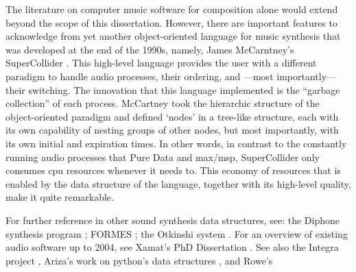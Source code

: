 	The literature on computer music software for composition alone would extend beyond the scope of this dissertation. However, there are important features to acknowledge from yet another object-oriented language for music synthesis that was developed at the end of the 1990s, namely, James McCarntney's SuperCollider \parencite{DBLP:conf/icmc/McCartney96, DBLP:conf/icmc/McCartney98}. This high-level language provides the user with a different paradigm to handle audio processes, their ordering, and ---most importantly--- their switching. The innovation that this language implemented is the ``garbage collection'' of each process. McCartney took the hierarchic structure of the object-oriented paradigm and defined `nodes' in a tree-like structure, each with its own capability of nesting groups of other nodes, but most importantly, with its own initial and expiration times. In other words, in contrast to the constantly running audio processes that Pure Data and \gls{max/msp}, SuperCollider only consumes \gls{cpu} resources whenever it needs to. This economy of resources that is enabled by the data structure of the language, together with its high-level quality, make it quite remarkable.

	For further reference in other sound synthesis data structures, see: the Diphone synthesis program \parencite{DBLP:conf/icmc/RodetDP88, Rodet1989, DBLP:conf/icmc/DepalleRGE93, DBLP:conf/icmc/RodetL96, DBLP:conf/icmc/RodetL97}; FORMES \parencite{DBLP:conf/icmc/BoyntonDPR86}; the Otkinshi system \parencite{icmc/bbp2372.2002.039}. For an overview of existing audio software up to 2004, see Xamat's PhD Dissertation \parencite[Chapter~2]{Amatriain/2004/phdthesis}. See also the Integra project \parencite{Bullock2009,Bullock2011}, Ariza's work on python's data structures \parencite{Ari05:Ano}, and Rowe's \parencite{Row92:Int, Row01:Mac}